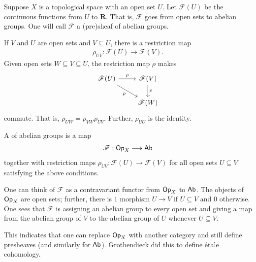 \documentclass [11 pt, oneside, margin = 1 in] {article}
\begin{document}
\begin{example}[Motivation]\label{}\text{}
Suppose $X$ is a topological space with an open set $U$. Let $\mathscr{F}(U)$ be the continuous functions from $U$ to $\mathbf{R}$. That is, $\mathscr{F}$ goes from open sets to abelian groups. One will call $\mathscr{F}$ a (pre)sheaf of abelian groups. 

If $V$ and $U$ are open sets and $V\subseteq U$, there is a restriction map
\begin{align*}
	\rho_{UV} : \mathscr{F}(U)  \longrightarrow \mathscr{F}(V).
\end{align*}
Given open sets $W\subseteq V\subseteq U$, the restriction map $\rho$ makes
\[
\begin{tikzcd}
	\mathscr{F}(U)\ar[r,"\rho"] \ar[dr,"\rho", swap] &  \mathscr{F}(V)\ar[d,"\rho"] \\
						   & \mathscr{F}(W)
\end{tikzcd}
\]
commute. That is, $\rho_{UW} = \rho_{VW} \rho_{UV}$. Further, $\rho_{UU}$ is the identity.

A  of abelian groups is a map
\begin{align*}
	\mathscr{F} : \textsf{Op}_X \longrightarrow \textsf{Ab}
\end{align*}
together with restriction maps $\rho_{UV} : \mathscr{F}(U) \longrightarrow  \mathscr{F}(V)$ for all open sets $U\subseteq V$ satisfying the above conditions. 
\end{example}

One can think of $\mathscr{F}$ as a contravariant functor from $\textsf{Op}_X$ to $\textsf{Ab}$. The objects of $\textsf{Op}_X$ are open sets; further, there is $1$ morphism $U\longrightarrow V$ if $U\subseteq V$ and $0$ otherwise. One sees that $\mathscr{F}$ is assigning an abelian group to every open set and giving a map from the abelian group of $V$ to the abelian group of $U$ whenever $U\subseteq V$.

\begin{remark}
	This indicates that one can replace $\textsf{Op}_X$ with another category and still define presheaves (and similarly for $\textsf{Ab}$). Grothendieck did this to define \'etale cohomology.
\end{remark}
\end{document}

